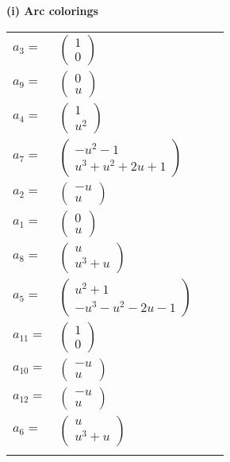 \documentclass[1p]{elsarticle_modified}
\theoremstyle{definition}
\begin{document}
\flushleft \textbf{(i) Arc colorings}\\
\begin{tabular}{m{7pt} m{180pt} m{7pt} m{180pt} }
\flushright $a_{3}=$&$\begin{pmatrix}1\\0\end{pmatrix}$ \\
\flushright $a_{9}=$&$\begin{pmatrix}0\\u\end{pmatrix}$ \\
\flushright $a_{4}=$&$\begin{pmatrix}1\\u^2\end{pmatrix}$ \\
\flushright $a_{7}=$&$\begin{pmatrix}- u^2-1\\u^3+u^2+2 u+1\end{pmatrix}$ \\
\flushright $a_{2}=$&$\begin{pmatrix}- u\\u\end{pmatrix}$ \\
\flushright $a_{1}=$&$\begin{pmatrix}0\\u\end{pmatrix}$ \\
\flushright $a_{8}=$&$\begin{pmatrix}u\\u^3+u\end{pmatrix}$ \\
\flushright $a_{5}=$&$\begin{pmatrix}u^2+1\\- u^3- u^2-2 u-1\end{pmatrix}$ \\
\flushright $a_{11}=$&$\begin{pmatrix}1\\0\end{pmatrix}$ \\
\flushright $a_{10}=$&$\begin{pmatrix}- u\\u\end{pmatrix}$ \\
\flushright $a_{12}=$&$\begin{pmatrix}- u\\u\end{pmatrix}$ \\
\flushright $a_{6}=$&$\begin{pmatrix}u\\u^3+u\end{pmatrix}$\\&\end{tabular}
\end{document}
